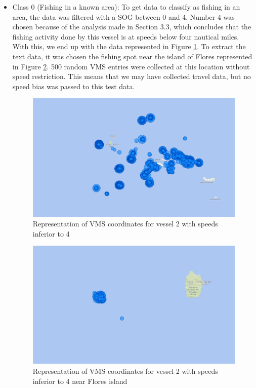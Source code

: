 \begin{itemize}
\item Class 0 (Fishing in a known area): To get data to classify as fishing in an area, the data was filtered with a SOG between 0 and 4. Number 4 was chosen because of the analysis made in Section 3.3, which concludes that the fishing activity done by this vessel is at speeds below four nautical miles. With this, we end up with the data represented in Figure \ref{fig:bi_2_all}. To extract the text data, it was chosen the fishing spot near the island of Flores represented in Figure \ref{fig:bi_2_flores}. 500 random VMS entries were collected at this location without speed restriction. This means that we may have collected travel data, but no speed bias was passed to this test data. 


\begin{figure}[]
\centering
\includegraphics[width=0.8\linewidth]{Chapters/img/2fishingAll.pdf}
\caption{Representation of VMS coordinates for vessel 2 with speeds inferior to 4 }
\label{fig:bi_2_all}
\end{figure}

\begin{figure}[]
\centering
\includegraphics[width=0.8\linewidth]{Chapters/img/2fishing.pdf}
\caption{Representation of VMS coordinates for vessel 2 with speeds inferior to 4 near Flores island }
\label{fig:bi_2_flores}
\end{figure}


\end{itemize}
